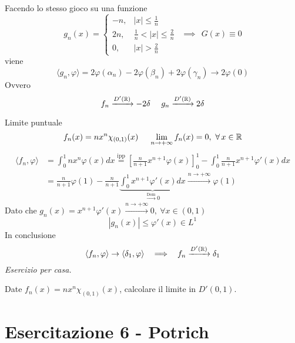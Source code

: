 Facendo lo stesso gioco su una funzione
\begin{equation*}
g_{n} (x) = 
\begin{cases}
- n, & |x| \leq \frac{1}{n}\\
2n, & \frac{1}{n} < |x| \leq \frac{2}{n}\\
0, & |x| > \frac{2}{n}
\end{cases} \ \ \implies \ \ G(x) \equiv 0
\end{equation*}
viene
\begin{equation*}
\langle g_{n}, \varphi \rangle = 2\varphi (\alpha_{n}) - 2\varphi (\beta_{n}) + 2\varphi (\gamma_{n})\rightarrow 2\varphi (0)
\end{equation*}
Ovvero
\begin{equation*}
f_{n}\xrightarrow{D'(\mathbb{R})} - 2\delta \ \ \ \ g_{n}\xrightarrow{D'(\mathbb{R})} 2\delta 
\end{equation*}
\Soluzione

Limite puntuale
\begin{equation*}
f_{n} (x) = nx^{n} \chi_{(0, 1)} (x)\ \ \ \ \lim\limits_{n\rightarrow + \infty} f_{n}(x) = 0, \ \forall x\in \RR 
\end{equation*}
\begin{equation*}
\begin{aligned}
\langle f_{n}, \varphi \rangle  & = \int^{1}_{0} nx^{n} \varphi (x) dx\overset{\text{ipp}}{=}\left[\frac{n}{n + 1} x^{n + 1} \varphi (x)\right]^{1}_{0} - \int^{1}_{0}\frac{n}{n + 1} x^{n + 1} \varphi '(x) dx\\
 & = \frac{n}{n + 1} \varphi (1) - \frac{n}{n + 1}\underbrace{\int^{1}_{0} x^{n + 1} \varphi '(x) dx}_{\xrightarrow{\text{Dom}} 0}\xrightarrow{n\rightarrow + \infty} \varphi (1)
\end{aligned}
\end{equation*}
Dato che $g_{n}(x) = x^{n + 1} \varphi '(x)\xrightarrow{n\rightarrow + \infty} 0, \ \forall x\in (0, 1)$
\begin{equation*}
| g_{n}(x)| \leq \varphi '(x) \in L^{1}
\end{equation*}
In conclusione
\begin{equation*}
\langle f_{n}, \varphi \rangle \rightarrow \langle \delta_{1}, \varphi \rangle \ \ \implies \ \ f_{n}\xrightarrow{D'(\RR)} \delta_{1}
\end{equation*}
\textit{Esercizio per casa.}

Date $f_{n}(x) = nx^{n} \chi_{(0, 1)}(x)$, calcolare il limite in $D'(0, 1)$.
\chapter{Esercitazione 6 - Potrich}
\ParteEsercizi
\Esercizio{}

